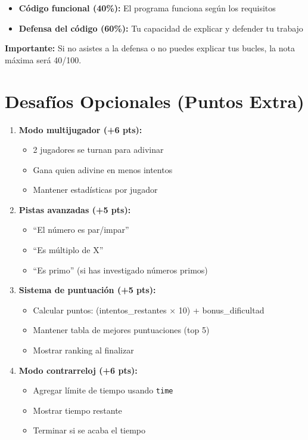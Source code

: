 \documentclass[12pt,a4paper]{article}
\begin{document}
\begin{itemize}
    \item \textbf{Código funcional (40\%):} El programa funciona según los requisitos
    \item \textbf{Defensa del código (60\%):} Tu capacidad de explicar y defender tu trabajo
\end{itemize}

\textbf{Importante:} Si no asistes a la defensa o no puedes explicar tus bucles, la nota máxima será 40/100.

\section{Desafíos Opcionales (Puntos Extra)}

\begin{enumerate}[leftmargin=*]
    \item \textbf{Modo multijugador (+6 pts):}
    \begin{itemize}
        \item 2 jugadores se turnan para adivinar
        \item Gana quien adivine en menos intentos
        \item Mantener estadísticas por jugador
    \end{itemize}
    
    \item \textbf{Pistas avanzadas (+5 pts):}
    \begin{itemize}
        \item ``El número es par/impar''
        \item ``Es múltiplo de X''
        \item ``Es primo'' (si has investigado números primos)
    \end{itemize}
    
    \item \textbf{Sistema de puntuación (+5 pts):}
    \begin{itemize}
        \item Calcular puntos: (intentos\_restantes $\times$ 10) + bonus\_dificultad
        \item Mantener tabla de mejores puntuaciones (top 5)
        \item Mostrar ranking al finalizar
    \end{itemize}
    
    \item \textbf{Modo contrarreloj (+6 pts):}
    \begin{itemize}
        \item Agregar límite de tiempo usando \texttt{time}
        \item Mostrar tiempo restante
        \item Terminar si se acaba el tiempo
    \end{itemize}
    

\end{enumerate}
\end{document}
